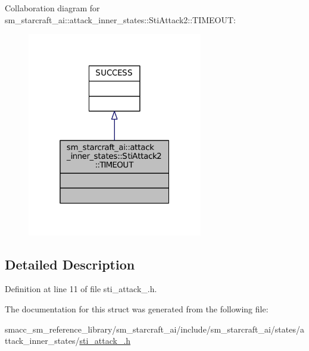 Collaboration diagram for sm\+\_\+starcraft\+\_\+ai\+:\+:attack\+\_\+inner\+\_\+states\+:\+:Sti\+Attack2\+:\+:T\+I\+M\+E\+O\+UT\+:
\nopagebreak
\begin{figure}[H]
\begin{center}
\leavevmode
\includegraphics[width=217pt]{structsm__starcraft__ai_1_1attack__inner__states_1_1StiAttack2_1_1TIMEOUT__coll__graph}
\end{center}
\end{figure}


\subsection{Detailed Description}


Definition at line 11 of file sti\+\_\+attack\+\_.\+h.



The documentation for this struct was generated from the following file\+:\begin{DoxyCompactItemize}
\item 
smacc\+\_\+sm\+\_\+reference\+\_\+library/sm\+\_\+starcraft\+\_\+ai/include/sm\+\_\+starcraft\+\_\+ai/states/attack\+\_\+inner\+\_\+states/\hyperlink{sti__attack__2_8h}{sti\+\_\+attack\+\_.\+h}\end{DoxyCompactItemize}
